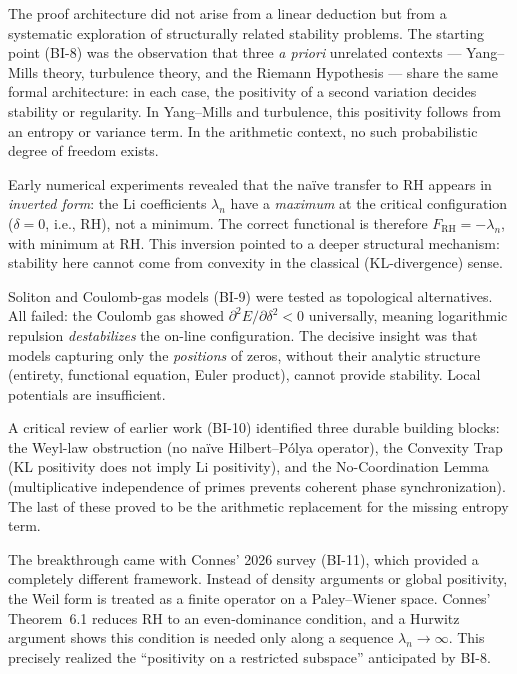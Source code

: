 \documentclass[12pt,a4paper]{article}
\theoremstyle{definition}
\theoremstyle{remark}
\begin{document}
The proof architecture did not arise from a linear deduction but from a systematic exploration of structurally related stability problems. The starting point (BI-8) was the observation that three \emph{a priori} unrelated contexts --- Yang--Mills theory, turbulence theory, and the Riemann Hypothesis --- share the same formal architecture: in each case, the positivity of a second variation decides stability or regularity. In Yang--Mills and turbulence, this positivity follows from an entropy or variance term. In the arithmetic context, no such probabilistic degree of freedom exists.

Early numerical experiments revealed that the na\"ive transfer to RH appears in \emph{inverted form}: the Li coefficients $\lambda_n$ have a \emph{maximum} at the critical configuration ($\delta = 0$, i.e., RH), not a minimum. The correct functional is therefore $F_{\mathrm{RH}} = -\lambda_n$, with minimum at RH. This inversion pointed to a deeper structural mechanism: stability here cannot come from convexity in the classical (KL-divergence) sense.

Soliton and Coulomb-gas models (BI-9) were tested as topological alternatives. All failed: the Coulomb gas showed $\partial^2 E/\partial\delta^2 < 0$ universally, meaning logarithmic repulsion \emph{destabilizes} the on-line configuration. The decisive insight was that models capturing only the \emph{positions} of zeros, without their analytic structure (entirety, functional equation, Euler product), cannot provide stability. Local potentials are insufficient.

A critical review of earlier work (BI-10) identified three durable building blocks: the Weyl-law obstruction (no na\"ive Hilbert--P\'olya operator), the Convexity Trap (KL positivity does not imply Li positivity), and the No-Coordination Lemma (multiplicative independence of primes prevents coherent phase synchronization). The last of these proved to be the arithmetic replacement for the missing entropy term.

The breakthrough came with Connes' 2026 survey \cite{Connes2025} (BI-11), which provided a completely different framework. Instead of density arguments or global positivity, the Weil form is treated as a finite operator on a Paley--Wiener space. Connes' Theorem~6.1 reduces RH to an even-dominance condition, and a Hurwitz argument shows this condition is needed only along a sequence $\lambda_n \to \infty$. This precisely realized the ``positivity on a restricted subspace'' anticipated by BI-8.
\end{document}
